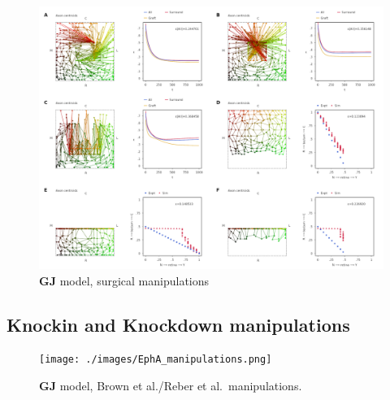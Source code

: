 \documentclass[11pt, a4paper, draft]{article}
\begin{document}
\begin{figure}
\includegraphics[width=\linewidth]{./images/fig_GJ_surgical.png}
\caption{$\mathbf{GJ}$ model, surgical manipulations}
\label{f:GJsurg}
\end{figure}

\subsection*{Knockin and Knockdown manipulations}



\begin{figure}
\texttt{[image: ./images/EphA\_manipulations.png]}
\caption{$\mathbf{GJ}$ model, Brown et al./Reber et al.~manipulations.}
\label{f:GJreber}
\end{figure}


\end{document}
